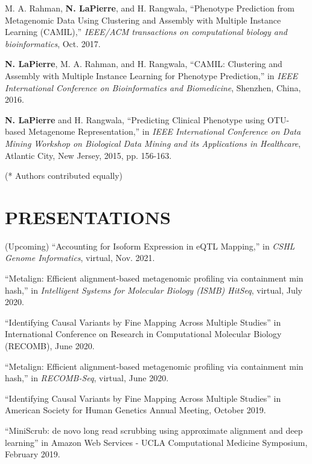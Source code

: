 \documentclass[margin, 10pt]{res} %
\begin{document}
\begin{resume}
M. A. Rahman, \textbf{N. LaPierre}, and H. Rangwala, ``Phenotype Prediction from Metagenomic Data Using Clustering and Assembly with Multiple Instance Learning (CAMIL),'' \emph{IEEE/ACM transactions on computational biology and bioinformatics}, Oct. 2017. 

\textbf{N. LaPierre}, M. A. Rahman, and H. Rangwala, ``CAMIL: Clustering and Assembly with Multiple Instance Learning for Phenotype Prediction,'' in {\sl IEEE International Conference on Bioinformatics and Biomedicine}, Shenzhen, China, 2016.

\textbf{N. LaPierre} and H. Rangwala, ``Predicting Clinical Phenotype using OTU-based Metagenome Representation,'' in {\sl IEEE International Conference on Data Mining Workshop on Biological Data Mining and its Applications in Healthcare}, Atlantic City, New Jersey, 2015, pp. 156-163.

(*  Authors contributed equally)


\section{PRESENTATIONS}

(Upcoming) ``Accounting for Isoform Expression in eQTL Mapping,'' in {\sl CSHL Genome Informatics}, virtual, Nov. 2021.

``Metalign: Efficient alignment-based metagenomic profiling via containment min hash,'' in {\sl Intelligent Systems for Molecular Biology (ISMB) HitSeq}, virtual, July 2020.

``Identifying Causal Variants by Fine Mapping Across Multiple Studies'' in International Conference on Research in Computational Molecular Biology (RECOMB), June 2020.

``Metalign: Efficient alignment-based metagenomic profiling via containment min hash,'' in {\sl RECOMB-Seq}, virtual, June 2020.

``Identifying Causal Variants by Fine Mapping Across Multiple Studies'' in American Society for Human Genetics Annual Meeting, October 2019.

``MiniScrub: de novo long read scrubbing using approximate alignment and deep learning'' in Amazon Web Services - UCLA Computational Medicine Symposium, February 2019.


\end{resume}
\end{document}
